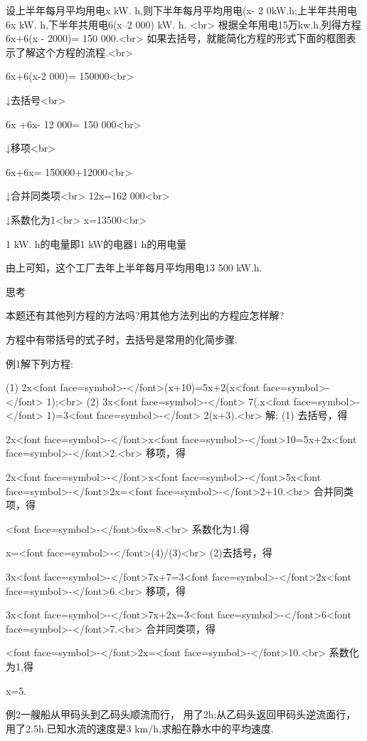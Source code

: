 设上半年每月平均用电x kW. h,则下半年每月平均用电(x- 2 0kW.h;上半年共用电6x kW. h,下半年共用电6(x--2 000) kW. h.
<br>
根据全年用电15万kw.h,列得方程
6x+6(x - 2000)= 150 000.<br>
如果去括号，就能简化方程的形式下面的框图表示了解这个方程的流程.<br>

6x+6(x-2 000)= 150000<br>

↓去括号<br>

6x +6x- 12 000= 150 000<br>

↓移项<br>

6x+6x= 150000+12000<br>

↓合并同类项<br>
12x=162 000<br>

↓系数化为1<br>
x=13500<br>


1 kW. h的电量即1 kW的电器1 h的用电量

由上可知，这个工厂去年上半年每月平均用电13 500 kW.h.

思考

本题还有其他列方程的方法吗?用其他方法列出的方程应怎样解?

      方程中有带括号的式子时，去括号是常用的化简步骤.

      例1解下列方程:

      (1) 2x<font face=symbol>-</font>(x+10)=5x+2(x<font face=symbol>-</font> 1);<br>
(2) 3x<font face=symbol>-</font> 7(.x<font face=symbol>-</font> 1)=3<font face=symbol>-</font> 2(x+3).<br>
解: (1) 去括号，得

      2x<font face=symbol>-</font>x<font face=symbol>-</font>10=5x+2x<font face=symbol>-</font>2.<br>
移项，得

      2x<font face=symbol>-</font>x<font face=symbol>-</font>5x<font face=symbol>-</font>2x=<font face=symbol>-</font>2+10.<br>
合并同类项，得

      <font face=symbol>-</font>6x=8.<br>
系数化为1.得

      x=<font face=symbol>-</font>(4)/(3)<br>
(2)去括号，得

      3x<font face=symbol>-</font>7x+7=3<font face=symbol>-</font>2x<font face=symbol>-</font>6.<br>
移项，得

      3x<font face=symbol>-</font>7x+2x=3<font face=symbol>-</font>6<font face=symbol>-</font>7.<br>
合并同类项，得

      <font face=symbol>-</font>2x=<font face=symbol>-</font>10.<br>
系数化为1,得

      x=5.

      例2一艘船从甲码头到乙码头顺流而行， 用了2h;从乙码头返回甲码头逆流面行，用了2.5h.已知水流的速度是3 km/h,求船在静水中的平均速度.

